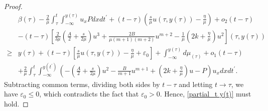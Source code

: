 \documentclass[10pt]{article}
\numberwithin{equation}{section}
\begin{document}
\begin{proof}
\begin{align*}
			&\beta(\tau)-\frac{2}{\mu}\int_{\tau}^{t}\int_{-\infty}^{y(\tau)}u_xPdxdt^\prime+(t-\tau)\left(\frac{s}{\mu}u(\tau,y(\tau))-\frac{\eta}{\mu}\right)+o_2(t-\tau)\\
			&-(t-\tau)\left[\frac{2}{3\mu}\left(\frac{A}{2}+\frac{s}{2\mu}\right)u^3+\frac{2B}{\mu(m+1)(m+2)}u^{m+2}-\frac{1}{\mu}\left(2k+\frac{\eta}{\mu}\right)u^{2}\right](\tau,y(\tau))\\
			\geq&y(\tau)+(t-\tau)\left[\frac{s}{\mu}u(\tau,y(\tau))-\frac{\eta}{\mu}+\varepsilon_0\right]+\int_{-\infty}^{y(\tau)}d\mu_{(\tau)}+o_1(t-\tau)\\
			&+\frac{2}{\mu}\int_{\tau}^{t}\int_{-\infty}^{y(t^\prime)}\left(-\left(\frac{A}{2}+\frac{s}{2\mu}\right)u^2-\frac{B}{m+1}u^{m+1}+\left(2k+\frac{\eta}{\mu}\right)u-P\right)u_xdxdt^\prime.
		\end{align*}
		Subtracting common terms, dividing both sides by $t-\tau$ and letting $t\to\tau$, we have $\varepsilon_0\leq0$, which contradicts the fact that $\varepsilon_0>0$. Hence, \eqref{partial_t y(t)} must hold.
		

\end{proof}
\end{document}
